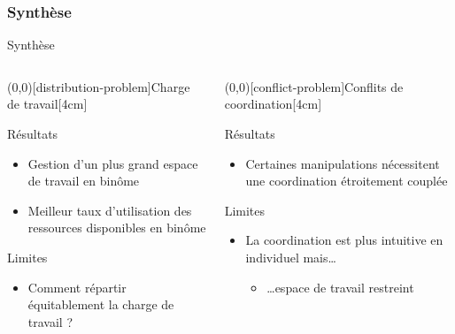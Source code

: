 \documentclass[english,french,dvips,10pt]{mybeamer}
\begin{document}
	\subsubsection{Synthèse}
	\begin{myframe}{Synthèse}
		\begin{columns}[t]
			\begin{column}{0.475\textwidth}
				\centering
				\myunode[90][shadowcolor=mygreen](0,0)[distribution-problem]{Charge de travail}[4cm]
				\begin{myplusblock}{Résultats }
					\begin{itemize}
						\item Gestion d'un plus grand espace de travail en binôme
						\item Meilleur taux d'utilisation des ressources disponibles en binôme
					\end{itemize}
				\end{myplusblock}
				\begin{myminusblock}{Limites}
					\begin{itemize}
						\item Comment répartir équitablement la charge de travail ?
					\end{itemize}
				\end{myminusblock}
			\end{column}
			\begin{column}{0.475\textwidth}
				\centering
				\myunode[90][shadowcolor=mygreen](0,0)[conflict-problem]{Conflits de coordination}[4cm]
				\begin{myplusblock}{Résultats }
					\begin{itemize}
						\item Certaines manipulations nécessitent une coordination étroitement couplée
					\end{itemize}
				\end{myplusblock}
				\begin{myminusblock}{Limites}
					\begin{itemize}
						\item La coordination est plus intuitive en individuel mais\dots
							\begin{itemize}
								\item \dots{}espace de travail restreint

\end{itemize}
\end{itemize}
\end{myminusblock}
\end{column}
\end{columns}
\end{myframe}
\end{document}
